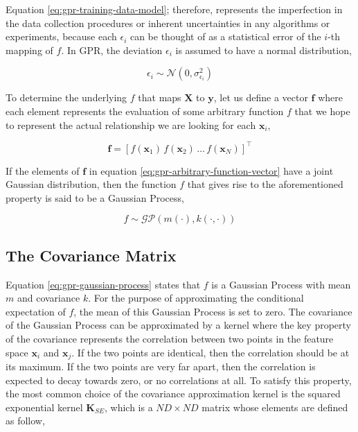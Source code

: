 \begin{spacing}{2.0}
    Equation \ref{eq:gpr-training-data-model}; therefore, represents the imperfection in the data collection procedures or inherent uncertainties
    in any algorithms or experiments, because each $\epsilon_i$ can be thought of as a statistical error of the $i$-th mapping of $f$. In GPR,
    the deviation $\epsilon_i$ is assumed to have a normal distribution,

    \begin{equation}
        \epsilon_i \sim \mathcal{N}(0,\sigma_{\epsilon_i}^2)
    \end{equation}

    To determine the underlying $f$ that maps $\mathbf{X}$ to $\mathbf{y}$, let us define a vector $\mathbf{f}$ where each element represents the 
    evaluation of some arbitrary function $f$ that we hope to represent the actual relationship we are looking for each $\mathbf{x}_i$,

    \begin{equation}
        \mathbf{f} = \left[f(\mathbf{x}_1)\,f(\mathbf{x}_2)\,\ldots\,f(\mathbf{x}_N)\right]^{\top}
        \label{eq:gpr-arbitrary-function-vector}
    \end{equation}

    If the elements of $\mathbf{f}$ in equation \ref{eq:gpr-arbitrary-function-vector} have a joint Gaussian distribution, then the function $f$
    that gives rise to the aforementioned property is said to be a Gaussian Process,

    \begin{equation}
        f \sim \mathcal{GP}\left(m(\cdot),k(\cdot,\cdot)\right)
        \label{eq:gpr-gaussian-process}
    \end{equation}

    \subsection{The Covariance Matrix}

    Equation \ref{eq:gpr-gaussian-process} states that $f$ is a Gaussian Process with mean $m$ and covariance $k$. For the purpose of approximating 
    the conditional expectation of $f$, the mean of this Gaussian Process is set to zero. The covariance of the Gaussian Process can be approximated 
    by a kernel where the key property of the covariance represents the correlation between two points in the feature space $\mathbf{x}_i$ and 
    $\mathbf{x}_j$. If the two points are identical, then the correlation should be at its maximum. If the two points are very far apart, then the 
    correlation is expected to decay towards zero, or no correlations at all. To satisfy this property, the most common choice of the covariance 
    approximation kernel is the squared exponential kernel $\mathbf{K}_{SE}$, which is a $ND \times ND$ matrix whose elements are defined as follow,


\end{spacing}
